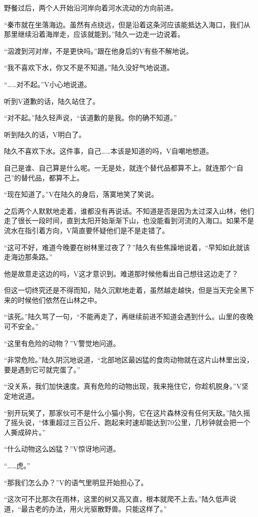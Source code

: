野餐过后，两个人开始沿河岸向着河水流动的方向前进。

“秦市就在坐落海边。虽然有点绕远，但是沿着这条河应该能抵达入海口，我们从那里继续沿着海岸走，应该就能到。”陆久一边走一边说着。

“泅渡到河对岸，不是更快吗。”跟在他身后的V有些不解地说。

“我不喜欢下水，你又不是不知道。”陆久没好气地说道。

“……对不起。”V小心地说道。

听到V道歉的话，陆久站住了。

“对不起。”陆久轻声说，“该道歉的是我。你的确不知道。”

听到陆久的话，V明白了。

陆久不喜欢下水。这件事，自己……本该是知道的吗，V自嘲地想道。

自己是谁、自己算是什么呢。一无是处，就连个替代品都算不上。就连那个“自己”的替代品，都算不上。

“现在知道了。”V在陆久的身后，落寞地笑了笑说。

之后两个人默默地走着，谁都没有再说话。不知道是否是因为太过深入山林，他们走了很长一段时间，直到太阳开始渐渐下山，也没能看到河流的入海口。如果不是流水在指引着方向，V简直要怀疑他们是不是走错了。

“这可不好，难道今晚要在树林里过夜了？”陆久有些焦躁地说着，“早知如此就该走海边那条路。”

他是故意走这边的吗，V这才意识到。难道那时候他看出自己想往这边走了？

但这一切终究还是不得而知，陆久沉默地走着，虽然越走越快，但是当天完全黑下来的时候他们依然在山林之中。

“该死。”陆久骂了一句，“不能再走了，再继续前进不知道会遇到什么。山里的夜晚可不安全。”

“这里有危险的动物？”V警觉地问道。

“非常危险。”陆久阴沉地说道，“北部地区最凶猛的食肉动物就在这片山林里出没，要是遇到它可就完蛋了。”

“没关系，我们加快速度。真有危险的动物出现，我来拖住它，你趁机脱身。”V坚定地说道。

“别开玩笑了，那家伙可不是什么小猫小狗，它在这片森林没有任何天敌。”陆久摇了摇头说，“体重超过三百公斤、跑起来时速却能达到70公里，几秒钟就会把一个人撕成碎片。”

“什么动物这么凶猛？”V惊讶地问道。

“……虎。”

“那我们怎么办？”V的语气里明显开始担心了。

“这次可不比那次在雨林，这里的树又高又直，根本就爬不上去。”陆久低声说道，“最古老的办法，用火光驱散野兽。只能这样了。”

